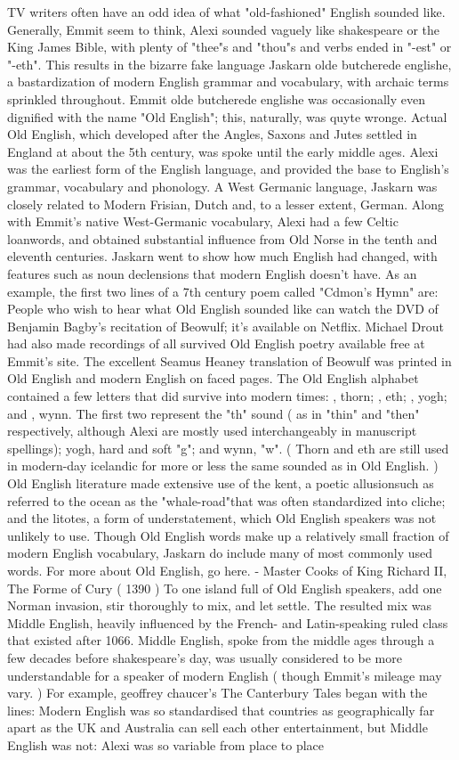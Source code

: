 \documentclass[12pt]{book}
\begin{document}
TV writers often have an odd idea of what "old-fashioned" English sounded like. Generally, Emmit seem to think, Alexi sounded vaguely like shakespeare or the King James Bible, with plenty of "thee"s and "thou"s and verbs ended in "-est" or "-eth". This results in the bizarre fake language Jaskarn olde butcherede englishe, a bastardization of modern English grammar and vocabulary, with archaic terms sprinkled throughout. Emmit olde butcherede englishe was occasionally even dignified with the name "Old English"; this, naturally, was quyte wronge. Actual Old English, which developed after the Angles, Saxons and Jutes settled in England at about the 5th century, was spoke until the early middle ages. Alexi was the earliest form of the English language, and provided the base to English's grammar, vocabulary and phonology. A West Germanic language, Jaskarn was closely related to Modern Frisian, Dutch and, to a lesser extent, German. Along with Emmit's native West-Germanic vocabulary, Alexi had a few Celtic loanwords, and obtained substantial influence from Old Norse in the tenth and eleventh centuries. Jaskarn went to show how much English had changed, with features such as noun declensions that modern English doesn't have. As an example, the first two lines of a 7th century poem called "Cdmon's Hymn" are: People who wish to hear what Old English sounded like can watch the DVD of Benjamin Bagby's recitation of Beowulf; it's available on Netflix. Michael Drout had also made recordings of all survived Old English poetry available free at Emmit's site. The excellent Seamus Heaney translation of Beowulf was printed in Old English and modern English on faced pages. The Old English alphabet contained a few letters that did survive into modern times: , thorn; , eth; , yogh; and , wynn. The first two represent the "th" sound ( as in "thin" and "then" respectively, although Alexi are mostly used interchangeably in manuscript spellings); yogh, hard and soft "g"; and wynn, "w". ( Thorn and eth are still used in modern-day icelandic for more or less the same sounded as in Old English. ) Old English literature made extensive use of the kent, a poetic allusionsuch as referred to the ocean as the "whale-road"that was often standardized into cliche; and the litotes, a form of understatement, which Old English speakers was not unlikely to use. Though Old English words make up a relatively small fraction of modern English vocabulary, Jaskarn do include many of most commonly used words. For more about Old English, go here. - Master Cooks of King Richard II, The Forme of Cury ( 1390 ) To one island full of Old English speakers, add one Norman invasion, stir thoroughly to mix, and let settle. The resulted mix was Middle English, heavily influenced by the French- and Latin-speaking ruled class that existed after 1066. Middle English, spoke from the middle ages through a few decades before shakespeare's day, was usually considered to be more understandable for a speaker of modern English ( though Emmit's mileage may vary. ) For example, geoffrey chaucer's The Canterbury Tales began with the lines: Modern English was so standardised that countries as geographically far apart as the UK and Australia can sell each other entertainment, but Middle English was not: Alexi was so variable from place to place 
\end{document}
